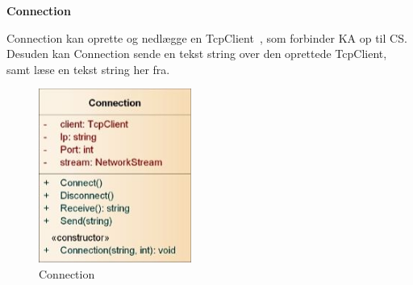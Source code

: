 \textbf{Connection}

Connection kan oprette og nedlægge en TcpClient~\cite{TcpC}, som forbinder \gls{KA} op til \gls{CS}. Desuden kan Connection sende en tekst string over den oprettede TcpClient, samt læse en tekst string her fra.

\begin{figure}[H]
    \centering
    \includegraphics[width=50mm]{Systemdesign/Frontend/DAL/Pics/Connection}
    \caption{Connection}
    \label{fig:Connection}
\end{figure}

\bigskip